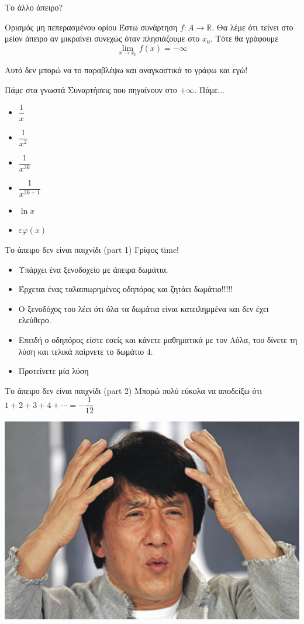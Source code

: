 \documentclass{presentation}
\begin{document}
\begin{frame}{Το άλλο άπειρο?}
  \begin{block}{Ορισμός μη πεπερασμένου ορίου}
    Έστω συνάρτηση $f:Α\to\mathbb{R}$. Θα λέμε ότι τείνει στο μείον άπειρο αν μικραίνει συνεχώς όταν πλησιάζουμε στο $x_0$. Τότε θα γράφουμε
    $$\lim\limits_{x \to x_0}{ f(x) }=-\infty$$
  \end{block} \pause
  Αυτό δεν μπορώ να το παραβλέψω και αναγκαστικά το γράφω και εγώ!
\end{frame}

\begin{frame}{Πάμε στα γνωστά}
  Συναρτήσεις που πηγαίνουν στο $+\infty$. \pause Πάμε... \pause
  \begin{itemize}[<+->]
    \item $\dfrac{1}{x}$
    \item $\dfrac{1}{x^2}$
    \item $\dfrac{1}{x^{2k}}$
    \item $\dfrac{1}{x^{2k+1}}$
    \item $\ln{x}$
    \item $εφ(x)$
  \end{itemize}
\end{frame}

\begin{frame}{Το άπειρο δεν είναι παιχνίδι (part 1)}
  Γρίφος time!
  \begin{itemize}
    \item Υπάρχει ένα ξενοδοχείο με άπειρα δωμάτια.
    \item Έρχεται ένας ταλαιπωρημένος οδηπόρος και ζητάει δωμάτιο!!!!!
    \item Ο ξενοδόχος του λέει ότι όλα τα δωμάτια είναι κατειλημμένα και δεν έχει ελεύθερο.
    \item Επειδή ο οδηπόρος είστε εσείς και κάνετε μαθηματικά με τον Λόλα, του δίνετε τη λύση και τελικά παίρνετε το δωμάτιο 4.
    \item Προτείνετε μία λύση
  \end{itemize}
\end{frame}

\begin{frame}{Το άπειρο δεν είναι παιχνίδι (part 2)}
  Μπορώ πολύ εύκολα να αποδείξω ότι $1+2+3+4+\cdots = -\dfrac{1}{12}$

  \centering
  \includegraphics[height=0.4\columnwidth]{images/qiev6}
\end{frame}
\end{document}

